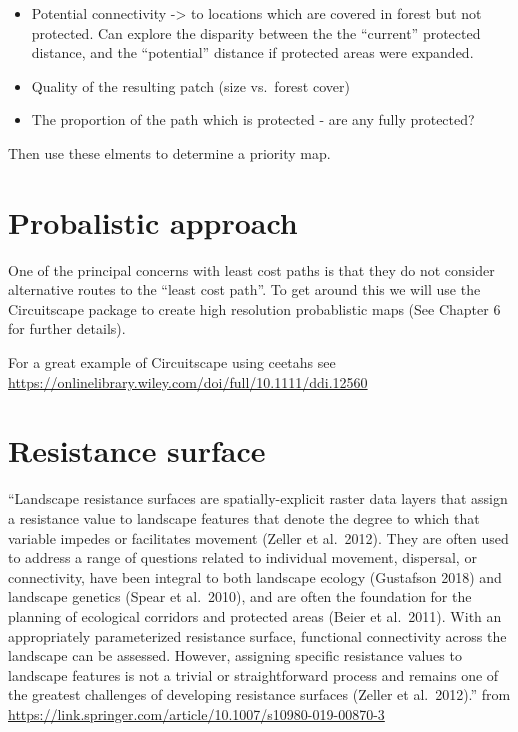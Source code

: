 \documentclass[
]{book}
\providecommand{\tightlist}{%
  \setlength{\itemsep}{0pt}\setlength{\parskip}{0pt}}
\begin{document}
\begin{itemize}
\tightlist
\item
  Potential connectivity -\textgreater{} to locations which are covered in forest but not protected. Can explore the disparity between the the ``current'' protected distance, and the ``potential'' distance if protected areas were expanded.
\item
  Quality of the resulting patch (size vs.~forest cover)
\item
  The proportion of the path which is protected - are any fully protected?
\end{itemize}

Then use these elments to determine a priority map.

\hypertarget{probalistic-approach}{%
\section{Probalistic approach}\label{probalistic-approach}}

One of the principal concerns with least cost paths is that they do not consider alternative routes to the ``least cost path''. To get around this we will use the Circuitscape package to create high resolution probablistic maps (See Chapter 6 for further details).

For a great example of Circuitscape using ceetahs see \url{https://onlinelibrary.wiley.com/doi/full/10.1111/ddi.12560}

\hypertarget{resistance-surface}{%
\section{Resistance surface}\label{resistance-surface}}

``Landscape resistance surfaces are spatially-explicit raster data layers that assign a resistance value to landscape features that denote the degree to which that variable impedes or facilitates movement (Zeller et al.~2012). They are often used to address a range of questions related to individual movement, dispersal, or connectivity, have been integral to both landscape ecology (Gustafson 2018) and landscape genetics (Spear et al.~2010), and are often the foundation for the planning of ecological corridors and protected areas (Beier et al.~2011). With an appropriately parameterized resistance surface, functional connectivity across the landscape can be assessed. However, assigning specific resistance values to landscape features is not a trivial or straightforward process and remains one of the greatest challenges of developing resistance surfaces (Zeller et al.~2012).'' from \url{https://link.springer.com/article/10.1007/s10980-019-00870-3}
\end{document}
